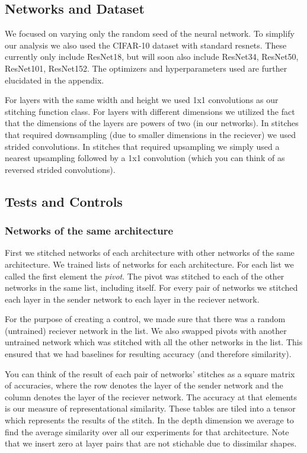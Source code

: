 \documentclass{article} %
\begin{document}
\subsection{Networks and Dataset}
We focused on varying only the random seed of the neural network. To simplify our analysis we also used the CIFAR-10 dataset
with standard resnets. These currently only include ResNet18, but will soon also include  ResNet34, ResNet50, ResNet101, ResNet152.
The optimizers and hyperparameters used are further elucidated in the appendix.

For layers with the same width and height we used 1x1 convolutions as our stitching function class. For layers with different dimensions
we utilized the fact that the dimensions of the layers are powers of two (in our networks). In stitches that required downsampling (due
to smaller dimensions in the reciever) we used strided convolutions. In stitches that required upsampling we simply used a nearest
upsampling followed by a 1x1 convolution (which you can think of as reversed strided convolutions).

\subsection{Tests and Controls}
\subsubsection*{Networks of the same architecture}
First we stitched networks of each architecture with other networks of the same architecture. We trained lists of networks for each 
architecture. For each list we called the first element the \textit{pivot}. The pivot was stitched to each of the other networks
in the same list, including itself. For every pair of networks we stitched each layer in the sender network to each layer in the
reciever network. 

For the purpose of creating a control, we made sure that there was a random (untrained) reciever network in the list. We also swapped 
pivots with another untrained network which was stitched with all the other networks in the list. This ensured that we had baselines
for resulting accuracy (and therefore similarity).

You can think of the result of each pair of networks' stitches as a square matrix of accuracies, where the row denotes the layer of the
sender network and the column denotes the layer of the reciever network. The accuracy at that elements is our measure of representational
similarity. These tables are tiled into a tensor which represents the results of the stitch. In the depth dimension we average to find
the average similarity over all our experiments for that architecture. Note that we insert zero at layer pairs that are not stichable
due to dissimilar shapes.
\end{document}
